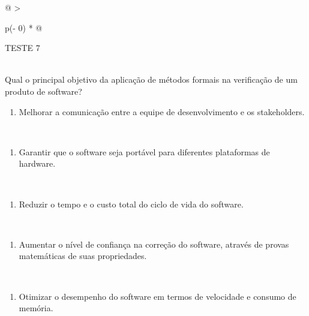 \documentclass[
]{book}
\providecommand{\tightlist}{%
  \setlength{\itemsep}{0pt}\setlength{\parskip}{0pt}}
\begin{document}
\begin{longtable}[]{@{}
  >{\raggedright\arraybackslash}p{(\columnwidth - 0\tabcolsep) * }@{}}
\toprule\noalign{}
\begin{minipage}[b]{\linewidth}\raggedright
TESTE 7
\end{minipage} \\
\midrule\noalign{}
\endhead
\bottomrule\noalign{}
\endlastfoot
Qual o principal objetivo da aplicação de métodos formais na verificação de um produto de software? \\
\begin{minipage}[t]{\linewidth}\raggedright
\begin{enumerate}
\def\labelenumi{\Alph{enumi})}
\tightlist
\item
  Melhorar a comunicação entre a equipe de desenvolvimento e os stakeholders.
\end{enumerate}
\end{minipage} \\
\begin{minipage}[t]{\linewidth}\raggedright
\begin{enumerate}
\def\labelenumi{\Alph{enumi})}
\setcounter{enumi}{1}
\tightlist
\item
  Garantir que o software seja portável para diferentes plataformas de hardware.
\end{enumerate}
\end{minipage} \\
\begin{minipage}[t]{\linewidth}\raggedright
\begin{enumerate}
\def\labelenumi{\Alph{enumi})}
\setcounter{enumi}{2}
\tightlist
\item
  Reduzir o tempo e o custo total do ciclo de vida do software.
\end{enumerate}
\end{minipage} \\
\begin{minipage}[t]{\linewidth}\raggedright
\begin{enumerate}
\def\labelenumi{\Alph{enumi})}
\setcounter{enumi}{3}
\tightlist
\item
  Aumentar o nível de confiança na correção do software, através de provas matemáticas de suas propriedades.
\end{enumerate}
\end{minipage} \\
\begin{minipage}[t]{\linewidth}\raggedright
\begin{enumerate}
\def\labelenumi{\Alph{enumi})}
\setcounter{enumi}{4}
\tightlist
\item
  Otimizar o desempenho do software em termos de velocidade e consumo de memória.
\end{enumerate}
\end{minipage} \\
\end{longtable}
\end{document}
